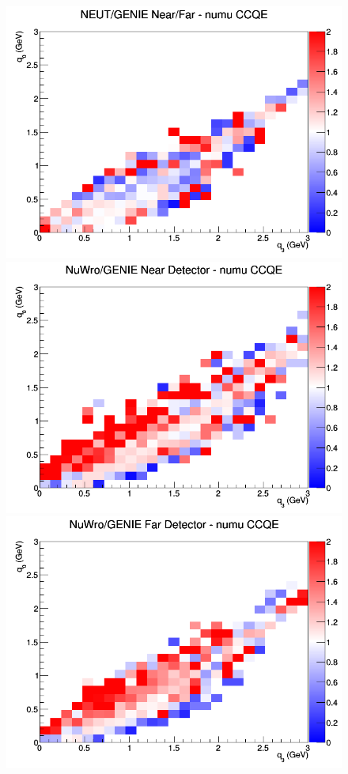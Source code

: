 \documentclass[12pt]{article}
\begin{document}
\begin{figure}[h]
\endminipage
{}
\includegraphics[width=\linewidth]{eff_q0_q3/FGT/ratios/CCQE_NEUT_GENIE_numu_NF_q3_q0.png}
\endminipage
\newline
{}
\includegraphics[width=\linewidth]{eff_q0_q3/FGT/ratios/CCQE_NuWro_GENIE_numu_near_q3_q0.png}
\endminipage
{}
\includegraphics[width=\linewidth]{eff_q0_q3/FGT/ratios/CCQE_NuWro_GENIE_numu_far_q3_q0.png}

\end{figure}
\end{document}
